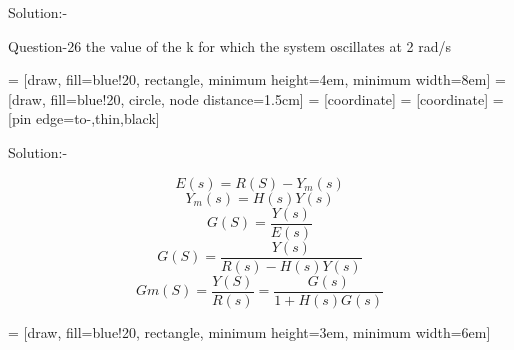 \documentclass[journal,12pt,twocolumn]{IEEEtran}
\begin{document}
\begin{frame}{Solution:- }
\begin{frame}{Question-26 }
the value of the k for which the system oscillates at 2 rad/s \\

\end{frame}
\begin{frame}{}
\begin{centre}


 = [draw, fill=blue!20, rectangle, 
    minimum height=4em, minimum width=8em]
 = [draw, fill=blue!20, circle, node distance=1.5cm]
 = [coordinate]
 = [coordinate]
 = [pin edge={to-,thin,black}]



\end{centre}

    
\end{frame}
\begin{frame}{Solution:- }
\begin{centre}
$$
E(s) = R(S) - Y_m(s)
$$
$$Y_m(s) = H(s)Y(s)$$
$$
 G(S) = \frac{Y(s)}{E(s)}
$$
$$
 G(S) = \frac{Y(s)}{R(s) - H(s)Y(s)}
$$
$$
 Gm(S) = \frac{Y(S)}{R(s)} = \frac{G(s)}{1 + H(s)G(s)}
$$


\end{centre}
 = [draw, fill=blue!20, rectangle, 
    minimum height=3em, minimum width=6em]

\begin{tikzpicture}[auto, node distance=2.5cm,>=latex']
 

\end{tikzpicture}
\end{frame}
\end{frame}
\end{document}
